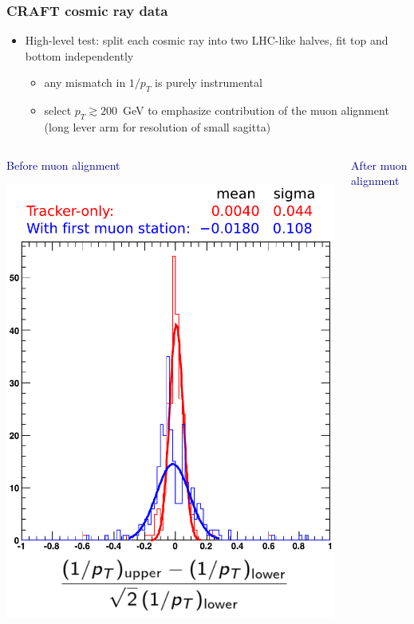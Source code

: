 \documentclass[compress]{beamer}
\begin{document}
\begin{frame}
\frametitle{CRAFT cosmic ray data}

\begin{itemize}
\item High-level test: split each cosmic ray into two LHC-like halves, fit top and bottom independently
\begin{itemize}
\item any mismatch in $1/p_T$ is purely instrumental
\item select $p_T \gtrsim 200$~GeV to emphasize contribution of the muon alignment (long lever arm for resolution of small sagitta)
\end{itemize}
\end{itemize}

\vspace{-0.5 cm}
\begin{columns}
\begin{center}
\textcolor{darkblue}{Before muon alignment}

\includegraphics[width=\linewidth]{without_alignment.pdf}
\end{center}
\begin{center}
\textcolor{darkblue}{After muon alignment}


\end{center}
\end{columns}
\end{frame}
\end{document}
